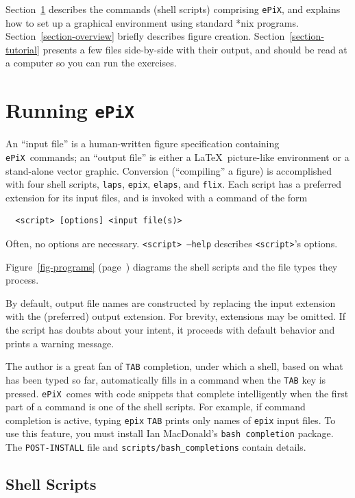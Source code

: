 \documentclass[12pt,letterpaper]{book}
\newcommand{\code}[1]{\texttt{#1}}
\newcommand{\filename}[1]{\texttt{#1}}
\newcommand{\Key}[1]{\texttt{#1}}
\newcommand{\ePiX}{\code{ePiX}}
\newcommand{\texicomment}{}
\newcommand{\texicommentend}{}
\begin{document}
Section~\ref{section-running} describes the commands (shell scripts)
comprising \ePiX, and explains how to set up a graphical environment
using standard *nix programs. Section~\ref{section-overview} briefly
describes figure creation. Section~\ref{section-tutorial} presents a
few files side-by-side with their output, and should be read at a
computer so you can run the exercises.


\section{Running \ePiX}
\label{section-running}

An ``input file'' is a human-written figure specification containing
\ePiX\ commands; an ``output file'' is either a \LaTeX\ picture-like
environment or a stand-alone vector graphic.  Conversion
(``compiling'' a figure) is accomplished with four shell scripts,
\code{laps}, \code{epix}, \code{elaps}, and \code{flix}.  Each script
has a preferred extension for its input files, and is invoked with a
command of the form
\begin{verbatim}
  <script> [options] <input file(s)>
\end{verbatim}
Often, no options are necessary.  \code{<script> --help}
describes \code{<script>}'s options.
\texicomment
Figure~\ref{fig-programs} (page~\pageref{fig-programs}) diagrams the
shell scripts and the file types they process.
\texicommentend

By default, output file names are constructed by replacing the input
extension with the (preferred) output extension. For brevity,
extensions may be omitted. If the script has doubts about your intent,
it proceeds with default behavior and prints a warning message.

The author is a great fan of \Key{TAB} completion, under which a
shell, based on what has been typed so far, automatically fills in a
command when the \Key{TAB} key is pressed.  \ePiX\ comes with code
snippets that complete intelligently when the first part of a command
is one of the shell scripts. For example, if command completion is
active, typing \code{epix} \Key{TAB} prints only names of \code{epix}
input files. To use this feature, you must install Ian MacDonald's
\code{bash completion} package. The \filename{POST-INSTALL} file and
\filename{scripts/bash\_completions} contain details.


\subsection*{Shell Scripts}
\end{document}
